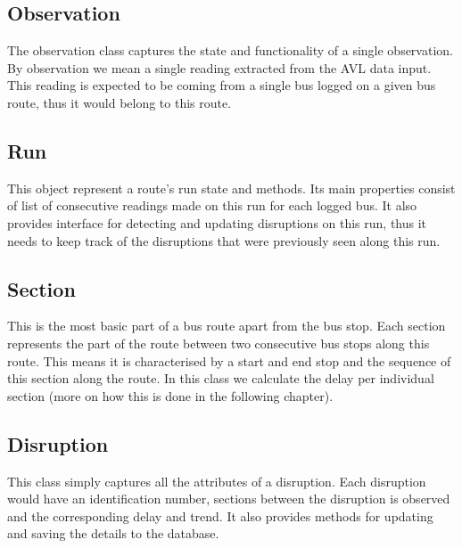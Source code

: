 \subsection{Observation}
The observation class captures the state and functionality of a single observation. By observation we mean a single reading extracted from the AVL data input. This reading is expected to be coming from a single bus logged on a given bus route, thus it would belong to this route. 

\subsection{Run}
This object represent a route's run state and methods. Its main properties consist of list of consecutive readings made on this run for each logged bus. It also provides interface for detecting and updating disruptions on this run, thus it needs to keep track of the disruptions that were previously seen along this run.

\subsection{Section}
This is the most basic part of a bus route apart from the bus stop. Each section represents the part of the route between two consecutive bus stops along this route. This means it is characterised by a start and end stop and the sequence of this section along the route. In this class we calculate the delay per individual section (more on how this is done in the following chapter).

\subsection{Disruption}
This class simply captures all the attributes of a disruption. Each disruption would have an identification number, sections between the disruption is observed and the corresponding delay and trend. It also provides methods for updating and saving the details to the database.